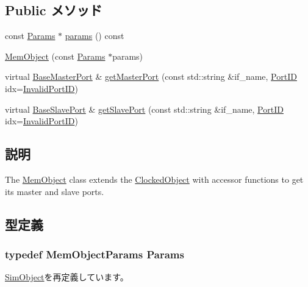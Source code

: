 \subsection*{Public メソッド}
\begin{DoxyCompactItemize}
\item 
const \hyperlink{classMemObject_a905bbc621eeec0ed08859e21c8c95412}{Params} $\ast$ \hyperlink{classMemObject_acd3c3feb78ae7a8f88fe0f110a718dff}{params} () const 
\item 
\hyperlink{classMemObject_a0390aa3eb5acd29074fac67b8d6472bd}{MemObject} (const \hyperlink{classMemObject_a905bbc621eeec0ed08859e21c8c95412}{Params} $\ast$params)
\item 
virtual \hyperlink{classBaseMasterPort}{BaseMasterPort} \& \hyperlink{classMemObject_adc4e675e51defbdd1e354dac729d0703}{getMasterPort} (const std::string \&if\_\-name, \hyperlink{base_2types_8hh_acef4d7d41cb21fdc252e20c04cd7bb8e}{PortID} idx=\hyperlink{base_2types_8hh_a65bf40f138cf863f0c5e2d8ca1144126}{InvalidPortID})
\item 
virtual \hyperlink{classBaseSlavePort}{BaseSlavePort} \& \hyperlink{classMemObject_ac918a145092d7514ebc6dbd952dceafb}{getSlavePort} (const std::string \&if\_\-name, \hyperlink{base_2types_8hh_acef4d7d41cb21fdc252e20c04cd7bb8e}{PortID} idx=\hyperlink{base_2types_8hh_a65bf40f138cf863f0c5e2d8ca1144126}{InvalidPortID})
\end{DoxyCompactItemize}


\subsection{説明}
The \hyperlink{classMemObject}{MemObject} class extends the \hyperlink{classClockedObject}{ClockedObject} with accessor functions to get its master and slave ports. 

\subsection{型定義}
\hypertarget{classMemObject_a905bbc621eeec0ed08859e21c8c95412}{
\subsubsection[{Params}]{\setlength{\rightskip}{0pt plus 5cm}typedef MemObjectParams {\bf Params}}}
\label{classMemObject_a905bbc621eeec0ed08859e21c8c95412}


\hyperlink{classSimObject_a0f0761d2db586a23bb2a2880b8f387bb}{SimObject}を再定義しています。


